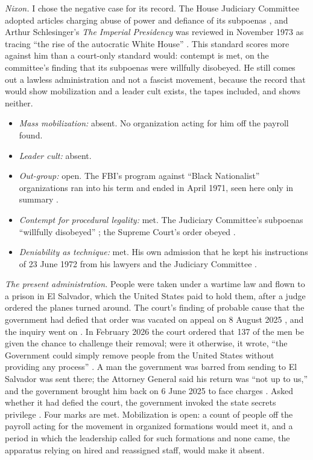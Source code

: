 \emph{Nixon.} I chose the negative case for its record. The House Judiciary Committee adopted articles charging abuse of power and defiance of its subpoenas \autocite{hjc1974articles}, and Arthur Schlesinger's \emph{The Imperial Presidency} was reviewed in November 1973 as tracing “the rise of the autocratic White House” \autocite{kirkus1973imperial}. This standard scores more against him than a court-only standard would: contempt is met, on the committee's finding that its subpoenas were willfully disobeyed. He still comes out a lawless administration and not a fascist movement, because the record that would show mobilization and a leader cult exists, the tapes included, and shows neither.

\begin{itemize}
\item \emph{Mass mobilization:} absent. No organization acting for him off the payroll found.
\item \emph{Leader cult:} absent.
\item \emph{Out-group:} open. The FBI's program against “Black Nationalist” organizations ran into his term and ended in April 1971, seen here only in summary \autocite{churchb3}.
\item \emph{Contempt for procedural legality:} met. The Judiciary Committee's subpoenas “willfully disobeyed” \autocite{hjc1974articles}; the Supreme Court's order obeyed \autocite{usvnixon1974,nixon1974statement}.
\item \emph{Deniability as technique:} met. His own admission that he kept his instructions of 23 June 1972 from his lawyers and the Judiciary Committee \autocite{nixon1974statement}.
\end{itemize}

\emph{The present administration.} People were taken under a wartime law and flown to a prison in El Salvador, which the United States paid to hold them, after a judge ordered the planes turned around. The court's finding of probable cause that the government had defied that order was vacated on appeal on 8 August 2025 \autocite{ap2025vacate}, and the inquiry went on \autocite{thanawala2025contempt,rizzo2026contempt}. In February 2026 the court ordered that 137 of the men be given the chance to challenge their removal; were it otherwise, it wrote, “the Government could simply remove people from the United States without providing any process” \autocite{thanawala2026cecot}. A man the government was barred from sending to El Salvador was sent there; the Attorney General said his return was “not up to us,” and the government brought him back on 6 June 2025 to face charges \autocite{pbs2025bukele,pbs2025abregoreturn}. Asked whether it had defied the court, the government invoked the state secrets privilege \autocite{kunzelman2025secrets}. Four marks are met. Mobilization is open: a count of people off the payroll acting for the movement in organized formations would meet it, and a period in which the leadership called for such formations and none came, the apparatus relying on hired and reassigned staff, would make it absent.

